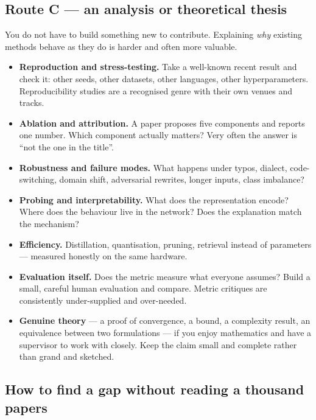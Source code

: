 \documentclass[11pt,a4paper]{article}
\begin{document}
\subsection{Route C --- an analysis or theoretical thesis}

You do not have to build something new to contribute. Explaining \emph{why}
existing methods behave as they do is harder and often more valuable.

\begin{itemize}
  \item \textbf{Reproduction and stress-testing.} Take a well-known recent
        result and check it: other seeds, other datasets, other languages,
        other hyperparameters. Reproducibility studies are a recognised genre
        with their own venues and tracks.
  \item \textbf{Ablation and attribution.} A paper proposes five components
        and reports one number. Which component actually matters? Very often
        the answer is ``not the one in the title''.
  \item \textbf{Robustness and failure modes.} What happens under typos,
        dialect, code-switching, domain shift, adversarial rewrites, longer
        inputs, class imbalance?
  \item \textbf{Probing and interpretability.} What does the representation
        encode? Where does the behaviour live in the network? Does the
        explanation match the mechanism?
  \item \textbf{Efficiency.} Distillation, quantisation, pruning, retrieval
        instead of parameters --- measured honestly on the same hardware.
  \item \textbf{Evaluation itself.} Does the metric measure what everyone
        assumes? Build a small, careful human evaluation and compare. Metric
        critiques are consistently under-supplied and over-needed.
  \item \textbf{Genuine theory} --- a proof of convergence, a bound, a
        complexity result, an equivalence between two formulations --- if you
        enjoy mathematics and have a supervisor to work with closely. Keep the
        claim small and complete rather than grand and sketched.
\end{itemize}

\subsection{How to find a gap without reading a thousand papers}
\end{document}
